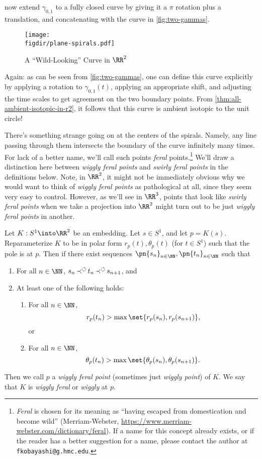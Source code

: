 \begin{example}
  now extend $\gamma_{0,1}$ to a fully closed curve by giving it a
  $\pi$ rotation plus a translation, and concatenating with the curve
  in \cref{fig:two-gammas}.
  \begin{figure}[H]
    \centering
    \texttt{[image: \\figdir/plane-spirals.pdf]}
    \caption{A ``Wild-Looking'' Curve in $\RR^2$}
    \label{fig:plane-spirals}
  \end{figure}
  Again: as can be seen from \cref{fig:two-gammas}, one can define
  this curve explicitly by applying a rotation to $\gamma_{0,1}(t)$,
  applying an appropriate shift, and adjusting the time scales to get
  agreement on the two boundary points. From
  \cref{thm:all-ambient-isotopic-in-r2}, it follows that this curve is
  ambient isotopic to the unit circle!
\end{example}
There's something strange going on at the centers of the spirals.
Namely, any line passing through them intersects the boundary of the
curve infinitely many times. For lack of a better name, we'll call
such points \emph{feral} points.\footnote{\emph{Feral} is chosen for
  its meaning as ``having escaped from domestication and become wild''
  (Merriam-Webster,
  \url{https://www.merriam-webster.com/dictionary/feral}). If a name
  for this concept already exists, or if the reader has a better
  suggestion for a name, please contact the author at
  \texttt{fkobayashi@g.hmc.edu}.} We'll draw a distinction here
between \emph{wiggly feral points} and \emph{swirly feral points} in
the definitions below. Note, in $\RR^2$, it might not be immediately
obvious why we would want to think of \emph{wiggly feral points} as
pathological at all, since they seem very easy to control. However, as
we'll see in $\RR^3$, points that look like \emph{swirly feral points}
when we take a projection into $\RR^2$ might turn out to be just
\emph{wiggly feral points} in another.
\begin{definition}\label{def:wiggly-feral}
  Let $K : S^1 \into \RR^2$ be an embedding. Let $s \in S^1$, and let
  $p = K(s)$. Reparameterize $K$ to be in polar form $r_p(t), \theta_p(t)$
  (for $t \in S^1$) such that the pole is at $p$. Then if there exist
  sequences $\pn{s_n}_{n \in \NN}, \pn{t_n}_{n \in \NN}$ such that
  \begin{enumerate}
    \item For all $n \in \NN$, $s_n \operatorname{\operatorname*{\prec}^{\circlearrowleft}} t_n \operatorname{\operatorname*{\prec}^{\circlearrowleft}} s_{n + 1}$, and
    \item At least one of the following holds:
      \begin{enumerate}
        \item For all $n \in \NN$,
          \[
          r_p(t_n) > \max\set{r_p(s_n), r_p(s_{n+1})},
          \]
          or
        \item For all $n \in \NN$,
          \[
          \theta_p(t_n) > \max\set{\theta_p(s_n), \theta_p(s_{n+1})}.
          \]
      \end{enumerate}
  \end{enumerate}
  Then we call $p$ a \emph{wiggly feral point} (sometimes just
  \emph{wiggly point}) of $K$. We say that $K$ is \emph{wiggly feral}
  or \emph{wiggly} at $p$.
\end{definition}
